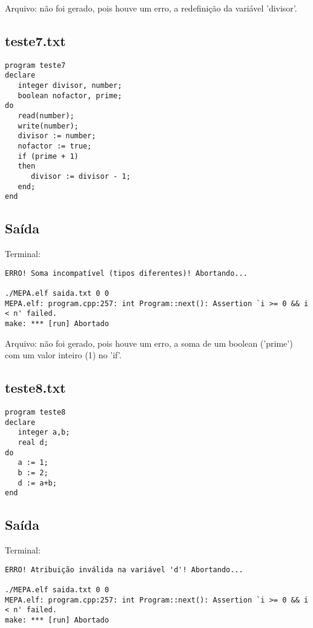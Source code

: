 \documentclass[a4paper,12pt]{article}
\begin{document}
Arquivo: não foi gerado, pois houve um erro, a redefinição da variável 'divisor'.

\subsection{teste7.txt}

\begin{footnotesize}\begin{verbatim}
program teste7
declare
   integer divisor, number;
   boolean nofactor, prime;
do 
   read(number);
   write(number);
   divisor := number;
   nofactor := true;
   if (prime + 1)
   then
      divisor := divisor - 1;
   end;
end
\end{verbatim}\end{footnotesize}

\subsection{Saída}
Terminal: 
\begin{footnotesize}\begin{verbatim}
ERRO! Soma incompatível (tipos diferentes)! Abortando...

./MEPA.elf saida.txt 0 0
MEPA.elf: program.cpp:257: int Program::next(): Assertion `i >= 0 && i < n' failed.
make: *** [run] Abortado
\end{verbatim}\end{footnotesize}

Arquivo: não foi gerado, pois houve um erro, a soma de um boolean ('prime') com um valor inteiro (1) no 'if'.

\subsection{teste8.txt}

\begin{footnotesize}\begin{verbatim}
program teste8
declare 
   integer a,b;
   real d;
do
   a := 1;
   b := 2;
   d := a+b;
end
\end{verbatim}\end{footnotesize}

\subsection{Saída}
Terminal: 
\begin{footnotesize}\begin{verbatim}
ERRO! Atribuição inválida na variável 'd'! Abortando...

./MEPA.elf saida.txt 0 0
MEPA.elf: program.cpp:257: int Program::next(): Assertion `i >= 0 && i < n' failed.
make: *** [run] Abortado
\end{verbatim}\end{footnotesize}
\end{document}
